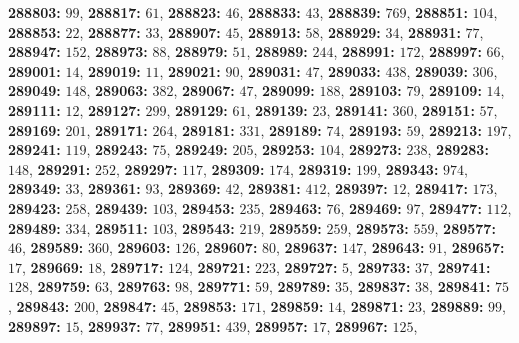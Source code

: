 \textsf{\bfseries 288803:} $99$, \textsf{\bfseries 288817:} $61$, \textsf{\bfseries 288823:} $46$, \textsf{\bfseries 288833:} $43$, \textsf{\bfseries 288839:} $769$, \textsf{\bfseries 288851:} $104$, \textsf{\bfseries 288853:} $22$, \textsf{\bfseries 288877:} $33$, \textsf{\bfseries 288907:} $45$, \textsf{\bfseries 288913:} $58$, \textsf{\bfseries 288929:} $34$, \textsf{\bfseries 288931:} $77$, \textsf{\bfseries 288947:} $152$, \textsf{\bfseries 288973:} $88$, \textsf{\bfseries 288979:} $51$, \textsf{\bfseries 288989:} $244$, \textsf{\bfseries 288991:} $172$, \textsf{\bfseries 288997:} $66$, \textsf{\bfseries 289001:} $14$, \textsf{\bfseries 289019:} $11$, \textsf{\bfseries 289021:} $90$, \textsf{\bfseries 289031:} $47$, \textsf{\bfseries 289033:} $438$, \textsf{\bfseries 289039:} $306$, \textsf{\bfseries 289049:} $148$, \textsf{\bfseries 289063:} $382$, \textsf{\bfseries 289067:} $47$, \textsf{\bfseries 289099:} $188$, \textsf{\bfseries 289103:} $79$, \textsf{\bfseries 289109:} $14$, \textsf{\bfseries 289111:} $12$, \textsf{\bfseries 289127:} $299$, \textsf{\bfseries 289129:} $61$, \textsf{\bfseries 289139:} $23$, \textsf{\bfseries 289141:} $360$, \textsf{\bfseries 289151:} $57$, \textsf{\bfseries 289169:} $201$, \textsf{\bfseries 289171:} $264$, \textsf{\bfseries 289181:} $331$, \textsf{\bfseries 289189:} $74$, \textsf{\bfseries 289193:} $59$, \textsf{\bfseries 289213:} $197$, \textsf{\bfseries 289241:} $119$, \textsf{\bfseries 289243:} $75$, \textsf{\bfseries 289249:} $205$, \textsf{\bfseries 289253:} $104$, \textsf{\bfseries 289273:} $238$, \textsf{\bfseries 289283:} $148$, \textsf{\bfseries 289291:} $252$, \textsf{\bfseries 289297:} $117$, \textsf{\bfseries 289309:} $174$, \textsf{\bfseries 289319:} $199$, \textsf{\bfseries 289343:} $974$, \textsf{\bfseries 289349:} $33$, \textsf{\bfseries 289361:} $93$, \textsf{\bfseries 289369:} $42$, \textsf{\bfseries 289381:} $412$, \textsf{\bfseries 289397:} $12$, \textsf{\bfseries 289417:} $173$, \textsf{\bfseries 289423:} $258$, \textsf{\bfseries 289439:} $103$, \textsf{\bfseries 289453:} $235$, \textsf{\bfseries 289463:} $76$, \textsf{\bfseries 289469:} $97$, \textsf{\bfseries 289477:} $112$, \textsf{\bfseries 289489:} $334$, \textsf{\bfseries 289511:} $103$, \textsf{\bfseries 289543:} $219$, \textsf{\bfseries 289559:} $259$, \textsf{\bfseries 289573:} $559$, \textsf{\bfseries 289577:} $46$, \textsf{\bfseries 289589:} $360$, \textsf{\bfseries 289603:} $126$, \textsf{\bfseries 289607:} $80$, \textsf{\bfseries 289637:} $147$, \textsf{\bfseries 289643:} $91$, \textsf{\bfseries 289657:} $17$, \textsf{\bfseries 289669:} $18$, \textsf{\bfseries 289717:} $124$, \textsf{\bfseries 289721:} $223$, \textsf{\bfseries 289727:} $5$, \textsf{\bfseries 289733:} $37$, \textsf{\bfseries 289741:} $128$, \textsf{\bfseries 289759:} $63$, \textsf{\bfseries 289763:} $98$, \textsf{\bfseries 289771:} $59$, \textsf{\bfseries 289789:} $35$, \textsf{\bfseries 289837:} $38$, \textsf{\bfseries 289841:} $75$, \textsf{\bfseries 289843:} $200$, \textsf{\bfseries 289847:} $45$, \textsf{\bfseries 289853:} $171$, \textsf{\bfseries 289859:} $14$, \textsf{\bfseries 289871:} $23$, \textsf{\bfseries 289889:} $99$, \textsf{\bfseries 289897:} $15$, \textsf{\bfseries 289937:} $77$, \textsf{\bfseries 289951:} $439$, \textsf{\bfseries 289957:} $17$, \textsf{\bfseries 289967:} $125$, 
